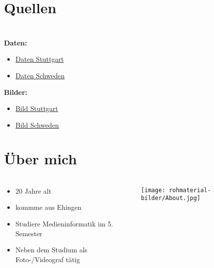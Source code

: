 \documentclass{beamer}
\begin{document}
\section{Quellen}
\begin{frame}
  \frametitle{\insertsection}
 \vspace{-2cm}
 \hspace{-0.8cm}
 \\
  \textbf{Daten:} \\
  \begin{itemize}
    \item \href{https://de.wikipedia.org/wiki/Stuttgart}{Daten Stuttgart}
    \item \href{https://de.wikipedia.org/wiki/Schweden}{Daten Schweden}
  \end{itemize}
    \textbf{Bilder:}
  \begin{itemize}
    \item \href{https://www.echo24.de/bilder/2020/04/22/13753996/schlossplatz-stuttgart-2kZQ5m3gqvec.jpg}{Bild Stuttgart}
    \item \href{https://d3aux7tjp119y2.cloudfront.net/images/ima120004-CMSTemplate_7y0VwYj.width-1650.jpg}{Bild Schweden}
  \end{itemize}

  \end{frame}

\section{Über mich}
\begin{frame}
  \frametitle{\insertshortauthor}
\vspace{-0.5cm}
\begin{columns}
  \begin{column}{0.6\textwidth}
     \begin{itemize}
      \item 20 Jahre alt
      \item kommme aus Ehingen
      \item Studiere Medieninformatik im 5. Semester
      \item Neben dem Studium als Foto-/Videograf tätig
     \end{itemize}
  \end{column}
  \begin{column}{0.4\textwidth}  %
      \begin{center}
        \texttt{[image: rohmaterial-bilder/About.jpg]}
       \end{center}
  \end{column}
  \end{columns}
\end{frame}
\end{document}
